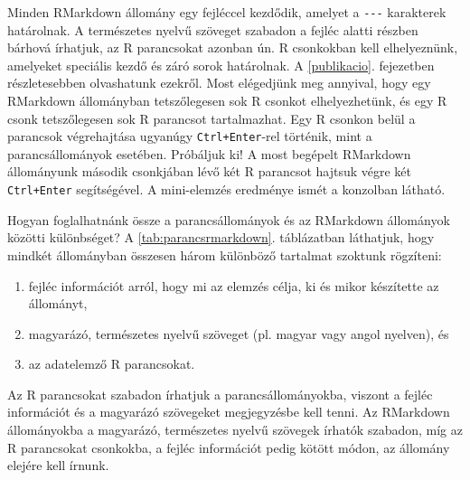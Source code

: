 \documentclass[
]{book}
\providecommand{\tightlist}{%
  \setlength{\itemsep}{0pt}\setlength{\parskip}{0pt}}
\begin{document}
Minden RMarkdown állomány egy fejléccel kezdődik, amelyet a \texttt{-\/-\/-} karakterek határolnak. A természetes nyelvű szöveget szabadon a fejléc alatti részben bárhová írhatjuk, az R parancsokat azonban ún. R csonkokban kell elhelyeznünk, amelyeket speciális kezdő és záró sorok határolnak. A \ref{publikacio}. fejezetben részletesebben olvashatunk ezekről. Most elégedjünk meg annyival, hogy egy RMarkdown állományban tetszőlegesen sok R csonkot elhelyezhetünk, és egy R csonk tetszőlegesen sok R parancsot tartalmazhat. Egy R csonkon belül a parancsok végrehajtása ugyanúgy \texttt{Ctrl+Enter}-rel történik, mint a parancsállományok esetében. Próbáljuk ki! A most begépelt RMarkdown állományunk második csonkjában lévő két R parancsot hajtsuk végre két \texttt{Ctrl+Enter} segítségével. A mini-elemzés eredménye ismét a konzolban látható.

Hogyan foglalhatnánk össze a parancsállományok és az RMarkdown állományok közötti különbséget? A \ref{tab:parancsrmarkdown}. táblázatban láthatjuk, hogy mindkét állományban összesen három különböző tartalmat szoktunk rögzíteni:

\begin{enumerate}
\def\labelenumi{\arabic{enumi}.}
\tightlist
\item
  fejléc információt arról, hogy mi az elemzés célja, ki és mikor készítette az állományt,
\item
  magyarázó, természetes nyelvű szöveget (pl. magyar vagy angol nyelven), és
\item
  az adatelemző R parancsokat.
\end{enumerate}

Az R parancsokat szabadon írhatjuk a parancsállományokba, viszont a fejléc információt és a magyarázó szövegeket megjegyzésbe kell tenni. Az RMarkdown állományokba a magyarázó, természetes nyelvű szövegek írhatók szabadon, míg az R parancsokat csonkokba, a fejléc információt pedig kötött módon, az állomány elejére kell írnunk.
\end{document}
